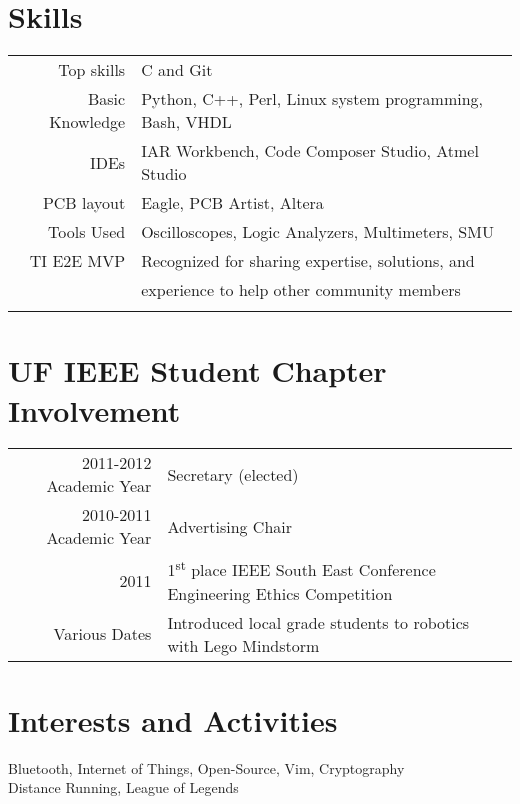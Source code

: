\documentclass[a4paper,10pt]{article} %
\begin{document}

\section{Skills}

\begin{tabular}{rl}
Top skills & C and Git\\
Basic Knowledge & Python, C++, Perl, Linux system programming, Bash, VHDL\\
IDEs & IAR Workbench, Code Composer Studio, Atmel Studio\\
PCB layout & Eagle, PCB Artist, Altera\\
Tools Used &  Oscilloscopes, Logic Analyzers, Multimeters, SMU\\
TI E2E MVP & Recognized for sharing expertise, solutions, and \\ &  \hspace{5mm} experience to help other community members\\
\\
\end{tabular}

\section{UF IEEE Student Chapter Involvement}

\begin{tabular}{rl}
2011-2012 Academic Year &  Secretary (elected) \\

2010-2011 Academic Year & Advertising Chair \\

2011 & 1\textsuperscript{st} place IEEE South East Conference Engineering Ethics Competition\\

Various Dates & Introduced local grade students to robotics with Lego Mindstorm\\
\end{tabular}



\section{Interests and Activities}

Bluetooth, Internet of Things, Open-Source, Vim, Cryptography\\
Distance Running, League of Legends

\end{document}
